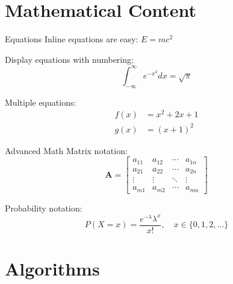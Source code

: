 \documentclass[aspectratio=169, dvipsnames]{beamer}
\begin{document}
\section{Mathematical Content}

\begin{frame}{Equations}
    Inline equations are easy: $E = mc^2$
    
    \vspace{1em}
    
    Display equations with numbering:
    \begin{equation}
        \int_{-\infty}^{\infty} e^{-x^2} dx = \sqrt{\pi}
    \end{equation}
    
    \vspace{1em}
    
    Multiple equations:
    \begin{align}
        f(x) &= x^2 + 2x + 1 \\
        g(x) &= (x+1)^2
    \end{align}
\end{frame}

\begin{frame}{Advanced Math}
    Matrix notation:
    \begin{equation}
        \mathbf{A} = \begin{bmatrix}
            a_{11} & a_{12} & \cdots & a_{1n} \\
            a_{21} & a_{22} & \cdots & a_{2n} \\
            \vdots & \vdots & \ddots & \vdots \\
            a_{m1} & a_{m2} & \cdots & a_{mn}
        \end{bmatrix}
    \end{equation}
    
    \vspace{1em}
    
    Probability notation:
    \begin{equation}
        P(X = x) = \frac{e^{-\lambda}\lambda^x}{x!}, \quad x \in \{0, 1, 2, \ldots\}
    \end{equation}
\end{frame}


\section{Algorithms}
\end{document}
